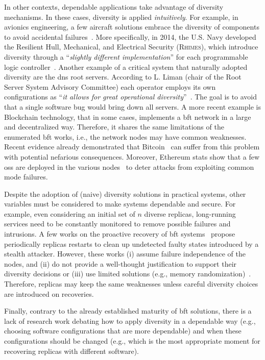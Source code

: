 In other contexts, dependable applications take advantage of diversity mechanisms. 
In these cases, diversity is applied \emph{intuitively}.
For example, in avionics engineering, a few aircraft solutions embrace the diversity of components to avoid accidental failures~\cite{Yeh:2004}.
More specifically, in 2014, the U.S. Navy developed the Resilient Hull, Mechanical, and Electrical Security (\textsc{Rhimes}), which introduce diversity through a ``\emph{slightly different implementation}'' for each programmable logic controller~\cite{rhimes}.
Another example of a critical system that naturally adopted diversity are the \gls{dns} root servers. 
According to L. Liman (chair of the Root Server System Advisory Committee) each operator employs its own configurations as ``\emph{it allows for great operational diversity}''~\cite{dns_root}. 
The goal is to avoid that a single software bug would bring down all servers.
A more recent example is Blockchain technology, that in some cases, implements a \gls{bft} network in a large and decentralized way.
Therefore, it shares the same limitations of the enumerated \gls{bft} works, i.e., the network nodes may have common weaknesses.
Recent evidence already demonstrated that Bitcoin~\cite{bitcoin} can suffer from this problem with potential nefarious consequences.
Moreover, Ethereum stats show that a few \glspl{os} are deployed in the various nodes~\cite{Ethstats,Ethernodes} to deter attacks from exploiting common mode failures.


Despite the adoption of (naive) diversity solutions in practical systems, other variables must be considered to make systems dependable and secure.
For example, even considering an initial set of $n$ diverse replicas, long-running services need to be constantly monitored to remove possible failures and intrusions.
A few works on the proactive recovery of \gls{bft} systems~\cite{Castro:2002,Sousa:2010,Roeder:2010,Platania:2014,Distler:2011} propose periodically replicas restarts to clean up undetected faulty states introduced by a stealth attacker. 
However, these works (i) assume failure independence of the nodes, and (ii) do not provide a well-thought justification to support their diversity decisions or (iii) use limited solutions (e.g., memory randomization)~\cite{Snow:2013,Bittau:2014}.
Therefore, replicas may keep the same weaknesses unless careful diversity choices are introduced on recoveries.


Finally, contrary to the already established maturity of \gls{bft} solutions, there is a lack of research work debating how to apply diversity in a dependable way (e.g., choosing software configurations that are more dependable) and when these configurations should be changed (e.g., which is the most appropriate moment for recovering replicas with different software).

